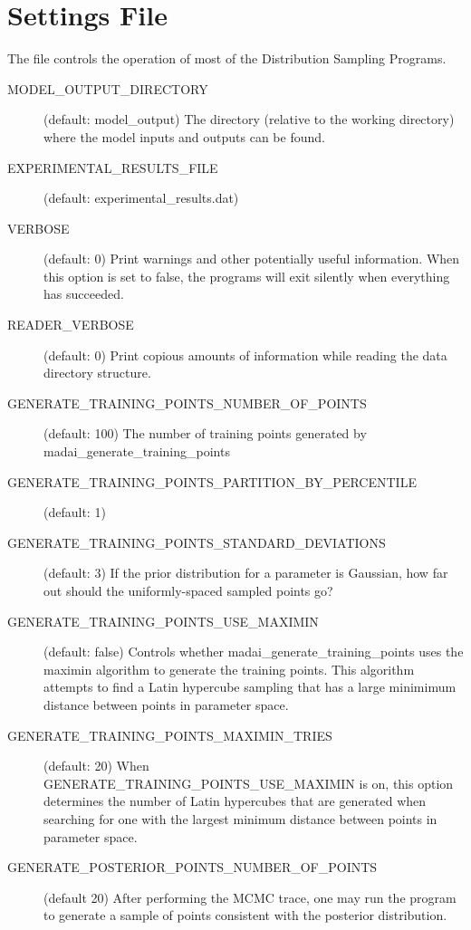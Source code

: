 
\section{Settings File}\label{sec:settings}

The file  controls the operation of most of the
Distribution Sampling Programs.

\begin{description}
    \item[MODEL\_OUTPUT\_DIRECTORY] (default: model\_output) The directory (relative to the working directory) where the model inputs and outputs can be found.
    \item[EXPERIMENTAL\_RESULTS\_FILE] (default: experimental\_results.dat)
    \item[VERBOSE] (default: 0) Print warnings and other potentially useful information. When this option is set to false, the programs will exit silently when everything has succeeded.
    \item[READER\_VERBOSE] (default: 0) Print copious amounts of information while reading the data directory structure.
    \item[GENERATE\_TRAINING\_POINTS\_NUMBER\_OF\_POINTS] (default: 100) The number of training points generated by madai\_generate\_training\_points
    \item[GENERATE\_TRAINING\_POINTS\_PARTITION\_BY\_PERCENTILE] (default: 1)
    \item[GENERATE\_TRAINING\_POINTS\_STANDARD\_DEVIATIONS] (default: 3) If the prior distribution for a parameter is Gaussian, how far out should the uniformly-spaced sampled points go?
    \item[GENERATE\_TRAINING\_POINTS\_USE\_MAXIMIN] (default: false) Controls whether madai\_generate\_training\_points uses the maximin algorithm to generate the training points. This algorithm attempts to find a Latin hypercube sampling that has a large minimimum distance between points in parameter space.
    \item[GENERATE\_TRAINING\_POINTS\_MAXIMIN\_TRIES] (default: 20) When GENERATE\_TRAINING\_POINTS\_USE\_MAXIMIN is on, this option determines the number of Latin hypercubes that are generated when searching for one with the largest minimum distance between points in parameter space.
    \item[GENERATE\_POSTERIOR\_POINTS\_NUMBER\_OF\_POINTS] (default 20) After performing the MCMC trace, one may run the program  to generate a sample of points consistent with the posterior distribution.

\end{description}
